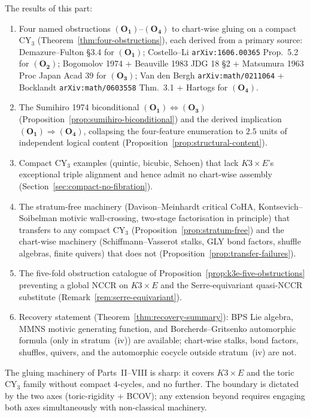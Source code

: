The results of this part:
\begin{enumerate}[leftmargin=2em]
\item Four named obstructions $(\mathbf{O_1})$--$(\mathbf{O_4})$
  to chart-wise gluing on a compact CY$_3$
  (Theorem~\ref{thm:four-obstructions}), each derived from a primary
  source: Demazure--Fulton \S3.4 for $(\mathbf{O_1})$; Costello--Li
  \texttt{arXiv:1606.00365} Prop.~5.2 for $(\mathbf{O_2})$; Bogomolov
  1974 + Beauville 1983 JDG 18 \S2 + Matsumura 1963 Proc Japan Acad 39
  for $(\mathbf{O_3})$; Van den Bergh \texttt{arXiv:math/0211064} +
  Bocklandt \texttt{arXiv:math/0603558} Thm.~3.1 + Hartogs for
  $(\mathbf{O_4})$.
\item The Sumihiro 1974 biconditional $(\mathbf{O_1}) \Leftrightarrow
  (\mathbf{O_3})$ (Proposition~\ref{prop:sumihiro-biconditional}) and
  the derived implication $(\mathbf{O_1}) \Rightarrow (\mathbf{O_4})$,
  collapsing the four-feature enumeration to $2.5$ units of independent
  logical content (Proposition~\ref{prop:structural-content}).
\item Compact CY$_3$ examples (quintic, bicubic, Schoen) that lack
  $K3 \times E$'s exceptional triple alignment and hence admit no
  chart-wise assembly (Section~\ref{sec:compact-no-fibration}).
\item The stratum-free machinery (Davison--Meinhardt critical CoHA,
  Kontsevich--Soibelman motivic wall-crossing, two-stage factorisation
  in principle) that transfers to any compact CY$_3$
  (Proposition~\ref{prop:stratum-free}) and the chart-wise machinery
  (Schiffmann--Vasserot stalks, GLY bond factors, shuffle algebras,
  finite quivers) that does not
  (Proposition~\ref{prop:transfer-failures}).
\item The five-fold obstruction catalogue of
  Proposition~\ref{prop:k3e-five-obstructions} preventing a global
  NCCR on $K3\times E$ and the Serre-equivariant quasi-NCCR substitute
  (Remark~\ref{rem:serre-equivariant}).
\item Recovery statement (Theorem~\ref{thm:recovery-summary}): BPS
  Lie algebra, MMNS motivic generating function, and
  Borcherds--Gritsenko automorphic formula (only in stratum~(iv)) are
  available; chart-wise stalks, bond factors, shuffles, quivers, and
  the automorphic cocycle outside stratum~(iv) are not.
\end{enumerate}

The gluing machinery of Parts~II--VIII is sharp: it covers $K3 \times E$
and the toric CY$_3$ family without compact $4$-cycles, and no further.
The boundary is dictated by the two axes (toric-rigidity + BCOV); any
extension beyond requires engaging both axes simultaneously with
non-classical machinery.

